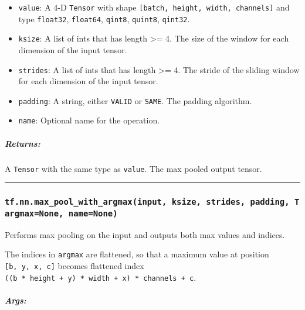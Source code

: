 \begin{itemize}
\tightlist
\item
  \texttt{value}: A 4-D \texttt{Tensor} with shape
  \texttt{{[}batch,\ height,\ width,\ channels{]}} and type
  \texttt{float32}, \texttt{float64}, \texttt{qint8}, \texttt{quint8},
  \texttt{qint32}.
\item
  \texttt{ksize}: A list of ints that has length \textgreater{}= 4. The
  size of the window for each dimension of the input tensor.
\item
  \texttt{strides}: A list of ints that has length \textgreater{}= 4.
  The stride of the sliding window for each dimension of the input
  tensor.
\item
  \texttt{padding}: A string, either
  \texttt{\textquotesingle{}VALID\textquotesingle{}} or
  \texttt{\textquotesingle{}SAME\textquotesingle{}}. The padding
  algorithm.
\item
  \texttt{name}: Optional name for the operation.
\end{itemize}

\subparagraph{Returns: }\label{returns-11}

A \texttt{Tensor} with the same type as \texttt{value}. The max pooled
output tensor.

\begin{center}\rule{0.5\linewidth}{\linethickness}\end{center}

\subsubsection{\texorpdfstring{\texttt{tf.nn.max\_pool\_with\_argmax(input,\ ksize,\ strides,\ padding,\ Targmax=None,\ name=None)}
}{tf.nn.max\_pool\_with\_argmax(input, ksize, strides, padding, Targmax=None, name=None) }}\label{tf.nn.maxux5fpoolux5fwithux5fargmaxinput-ksize-strides-padding-targmaxnone-namenone}

Performs max pooling on the input and outputs both max values and
indices.

The indices in \texttt{argmax} are flattened, so that a maximum value at
position \texttt{{[}b,\ y,\ x,\ c{]}} becomes flattened index
\texttt{((b\ *\ height\ +\ y)\ *\ width\ +\ x)\ *\ channels\ +\ c}.

\subparagraph{Args: }\label{args-12}

